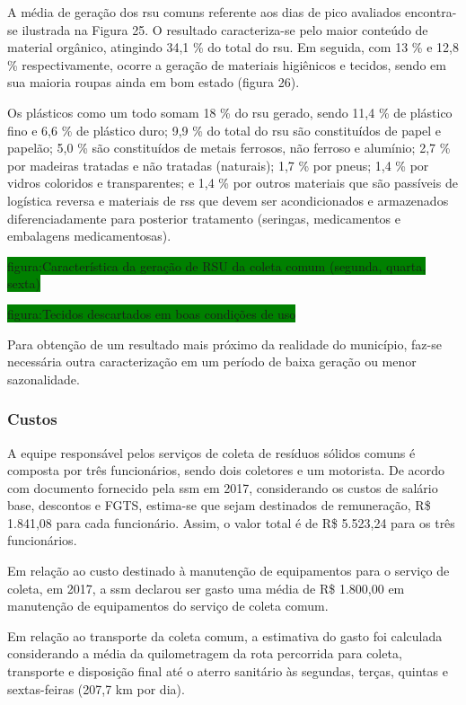 %	
	
	A média de geração dos \gls{rsu} comuns referente aos dias de pico avaliados encontra-se ilustrada na Figura 25. O resultado caracteriza-se pelo maior conteúdo de material orgânico, atingindo 34,1 \% do total do \gls{rsu}. Em seguida, com 13 \% e 12,8 \% respectivamente, ocorre a geração de materiais higiênicos e tecidos, sendo em sua maioria roupas ainda em bom estado (figura 26). 
	
	Os plásticos como um todo somam 18 \% do \gls{rsu} gerado, sendo 11,4 \% de plástico fino e 6,6 \% de plástico duro; 9,9 \% do total do \gls{rsu} são constituídos de papel e papelão; 5,0 \% são constituídos de metais ferrosos, não ferroso e alumínio; 2,7 \% por madeiras tratadas e não tratadas (naturais); 1,7 \% por pneus; 1,4 \% por vidros coloridos e transparentes; e 1,4 \% por outros materiais que são passíveis de logística reversa e  materiais de \gls{rss} que devem ser acondicionados e armazenados diferenciadamente para posterior tratamento (seringas, medicamentos e embalagens medicamentosas).
	
	\colorbox{green}{figura:Característica da geração de RSU da coleta comum (segunda, quarta, sexta)}
	
	\colorbox{green}{figura:Tecidos descartados em boas condições de uso}
	
	Para obtenção de um resultado mais próximo da realidade do município, faz-se necessária outra caracterização em um período de baixa geração ou menor sazonalidade.
	
	\subsubsection{Custos}
	
	A equipe responsável pelos serviços de coleta de resíduos sólidos comuns é composta por três funcionários, sendo dois coletores e um motorista. De acordo com documento fornecido pela \gls{ssm} em 2017, considerando os custos de salário base, descontos e FGTS, estima-se que sejam destinados de remuneração, R\$ 1.841,08 para cada funcionário. Assim, o valor total é de R\$ 5.523,24 para os três funcionários.
	
	Em relação ao custo destinado à manutenção de equipamentos para o serviço de coleta, em 2017, a \gls{ssm} declarou ser gasto uma média de R\$ 1.800,00 em manutenção de equipamentos do serviço de coleta comum.
	
	Em relação ao transporte da coleta comum, a estimativa do gasto foi calculada considerando a média da quilometragem da rota percorrida para coleta, transporte e disposição final até o aterro sanitário às segundas, terças, quintas e sextas-feiras (207,7 km por dia). 
	
